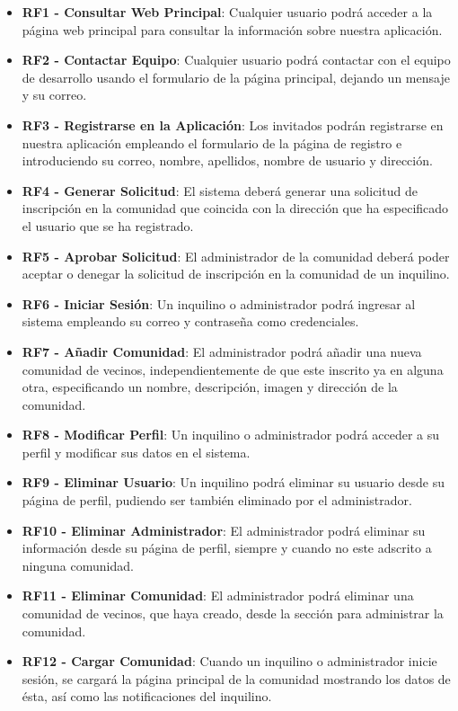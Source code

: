 \begin{itemize}
	\item \textbf{RF1 - Consultar Web Principal}: Cualquier usuario podrá acceder a la página web principal para consultar la información sobre nuestra aplicación.
	\item \textbf{RF2 - Contactar Equipo}: Cualquier usuario podrá contactar con el equipo de desarrollo usando el formulario de la página principal, dejando un mensaje y su correo.
	\item \textbf{RF3 - Registrarse en la Aplicación}: Los invitados podrán registrarse en nuestra aplicación empleando el formulario de la página de registro e introduciendo su correo, nombre, apellidos, nombre de usuario y dirección.
	\item \textbf{RF4 - Generar Solicitud}: El sistema deberá generar una solicitud de inscripción en la comunidad que coincida con la dirección que ha especificado el usuario que se ha registrado.
	\item \textbf{RF5 - Aprobar Solicitud}: El administrador de la comunidad deberá poder aceptar o denegar la solicitud de inscripción en la comunidad de un inquilino.
	\item \textbf{RF6 - Iniciar Sesión}: Un inquilino o administrador podrá ingresar al sistema empleando su correo y contraseña como credenciales.
	\item \textbf{RF7 - Añadir Comunidad}: El administrador podrá añadir una nueva comunidad de vecinos, independientemente de que este inscrito ya en alguna otra, especificando un nombre, descripción, imagen y dirección de la comunidad.
	\item \textbf{RF8 - Modificar Perfil}: Un inquilino o administrador podrá acceder a su perfil y modificar sus datos en el sistema.
	\item \textbf{RF9 - Eliminar Usuario}: Un inquilino podrá eliminar su usuario desde su página de perfil, pudiendo ser también eliminado por el administrador.
	\item \textbf{RF10 - Eliminar Administrador}: El administrador podrá eliminar su información desde su página de perfil, siempre y cuando no este adscrito a ninguna comunidad.
	\item \textbf{RF11 - Eliminar Comunidad}: El administrador podrá eliminar una comunidad de vecinos, que haya creado, desde la sección para administrar la comunidad.
	\item \textbf{RF12 - Cargar Comunidad}: Cuando un inquilino o administrador inicie sesión, se cargará la página principal de la comunidad mostrando los datos de ésta, así como las notificaciones del inquilino.

\end{itemize}
